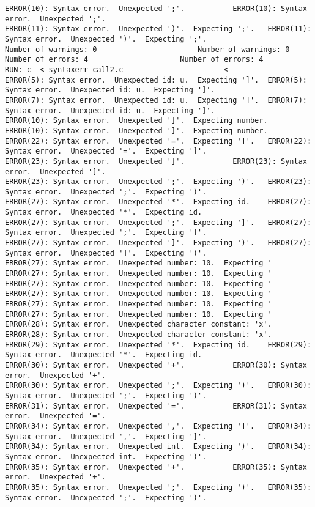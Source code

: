 \documentclass[12pt]{book}
\begin{document}
\begin{lstlisting}
ERROR(10): Syntax error.  Unexpected ';'.			ERROR(10): Syntax error.  Unexpected ';'.
ERROR(11): Syntax error.  Unexpected ')'.  Expecting ';'.	ERROR(11): Syntax error.  Unexpected ')'.  Expecting ';'.
Number of warnings: 0						Number of warnings: 0
Number of errors: 4						Number of errors: 4
RUN: c- < syntaxerr-call2.c-				      <
ERROR(5): Syntax error.  Unexpected id: u.  Expecting ']'.	ERROR(5): Syntax error.  Unexpected id: u.  Expecting ']'.
ERROR(7): Syntax error.  Unexpected id: u.  Expecting ']'.	ERROR(7): Syntax error.  Unexpected id: u.  Expecting ']'.
ERROR(10): Syntax error.  Unexpected ']'.  Expecting number.	ERROR(10): Syntax error.  Unexpected ']'.  Expecting number.
ERROR(22): Syntax error.  Unexpected '='.  Expecting ']'.	ERROR(22): Syntax error.  Unexpected '='.  Expecting ']'.
ERROR(23): Syntax error.  Unexpected ']'.			ERROR(23): Syntax error.  Unexpected ']'.
ERROR(23): Syntax error.  Unexpected ';'.  Expecting ')'.	ERROR(23): Syntax error.  Unexpected ';'.  Expecting ')'.
ERROR(27): Syntax error.  Unexpected '*'.  Expecting id.	ERROR(27): Syntax error.  Unexpected '*'.  Expecting id.
ERROR(27): Syntax error.  Unexpected ';'.  Expecting ']'.	ERROR(27): Syntax error.  Unexpected ';'.  Expecting ']'.
ERROR(27): Syntax error.  Unexpected ']'.  Expecting ')'.	ERROR(27): Syntax error.  Unexpected ']'.  Expecting ')'.
ERROR(27): Syntax error.  Unexpected number: 10.  Expecting '	ERROR(27): Syntax error.  Unexpected number: 10.  Expecting '
ERROR(27): Syntax error.  Unexpected number: 10.  Expecting '	ERROR(27): Syntax error.  Unexpected number: 10.  Expecting '
ERROR(27): Syntax error.  Unexpected number: 10.  Expecting '	ERROR(27): Syntax error.  Unexpected number: 10.  Expecting '
ERROR(28): Syntax error.  Unexpected character constant: 'x'.	ERROR(28): Syntax error.  Unexpected character constant: 'x'.
ERROR(29): Syntax error.  Unexpected '*'.  Expecting id.	ERROR(29): Syntax error.  Unexpected '*'.  Expecting id.
ERROR(30): Syntax error.  Unexpected '+'.			ERROR(30): Syntax error.  Unexpected '+'.
ERROR(30): Syntax error.  Unexpected ';'.  Expecting ')'.	ERROR(30): Syntax error.  Unexpected ';'.  Expecting ')'.
ERROR(31): Syntax error.  Unexpected '='.			ERROR(31): Syntax error.  Unexpected '='.
ERROR(34): Syntax error.  Unexpected ','.  Expecting ']'.	ERROR(34): Syntax error.  Unexpected ','.  Expecting ']'.
ERROR(34): Syntax error.  Unexpected int.  Expecting ')'.	ERROR(34): Syntax error.  Unexpected int.  Expecting ')'.
ERROR(35): Syntax error.  Unexpected '+'.			ERROR(35): Syntax error.  Unexpected '+'.
ERROR(35): Syntax error.  Unexpected ';'.  Expecting ')'.	ERROR(35): Syntax error.  Unexpected ';'.  Expecting ')'.

\end{lstlisting}
\end{document}
